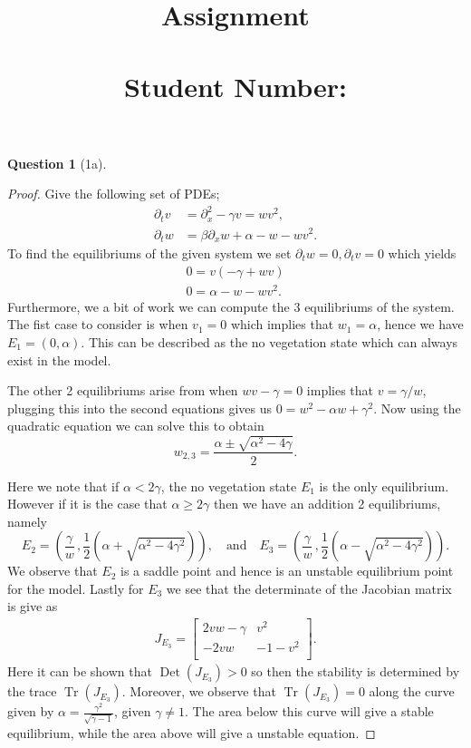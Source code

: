 \documentclass[11pt]{article}
\author{}
\title{\vspace{-50pt}
    \Huge \subject \\ Assignment \hw
\\ \vspace{20pt} \large \name \\ Student Number:\SID}
\date{}
\theoremstyle{quest}
\newtheorem*{question}{Question}
\newcommand{\Dp}{\partial}
\DeclareMathOperator{\Tr}{Tr}
\DeclareMathOperator{\Det}{Det}
\begin{document}
\maketitle{}




\begin{question}[1a]
\end{question}
\begin{proof}
    Give the following set of PDEs;
    \begin{align*}
        \Dp_t v &= \Dp_{x}^{2} - \gamma v = wv^2, \\
        \Dp_t w &= \beta \Dp_x w +\alpha -w -wv^2.
    \end{align*}
    To find the equilibriums of the given system we set $ \Dp_t w = 0, \Dp_t v = 0$ which yields
    \begin{align*}
        0= v \left( -\gamma + w v \right)\\
        0= \alpha -w -wv^2.
    \end{align*}
    Furthermore, we a bit of work we can compute the 3 equilibriums of the system.
    The fist case to consider is when $v_1 =0$ which implies that $w_1 =\alpha$, hence we have
    $E_1 = \left( 0, \alpha  \right)$. This can be described as the no vegetation state which
    can always exist in the model.

    The other 2 equilibriums arise from when $ wv-\gamma =0$ implies that $v=\gamma / w$, plugging this
    into the second equations gives us $0=w^2 - \alpha w + \gamma^2$. Now using the quadratic equation
    we can solve this to obtain $$ w_{2,3} = \frac{\alpha \pm \sqrt{ \alpha^2 - 4 \gamma }}{2}.$$

    Here we note that if $\alpha < 2 \gamma$, the no vegetation state $E_1$ is the only equilibrium.
    However if it is the case that $ \alpha \geq 2 \gamma$ then we have an addition 2 equilibriums, namely
    $$ E_2 = \left( \frac{\gamma }{w} \, , \frac{1}{2}\left(\alpha + \sqrt{\alpha^2 -4\gamma^2} \right)  \right),
    \quad \text{and} \quad E_3 = \left( \frac{\gamma }{w}\, , \frac{1}{2} \left(\alpha -\sqrt{\alpha^2 -4\gamma^2} \right)  \right). $$
    We observe that $E_2$ is a saddle point and hence is an unstable equilibrium point for the model.
    Lastly for $E_3$ we see that the determinate of the Jacobian matrix is give as
    \begin{align*}
        J_{E_3} = 
        \begin{bmatrix}
            2vw - \gamma & v^2 \\
            -2vw & -1 -v^2 \\
        \end{bmatrix}
        .
    \end{align*}
    Here it can be shown that $\Det(J_{E_3}) > 0$ so then the stability is determined by the trace $\Tr(J_{E_3})$.
    Moreover, we observe that $\Tr(J_{E_3}) = 0$ along the curve given by $\alpha = \frac{\gamma^2}{\sqrt{\gamma-1}}$, given
    $\gamma \neq 1$. The area below this curve will give a stable equilibrium, while the area above will give a unstable
    equation.
\end{proof}
\clearpage
\end{document}
